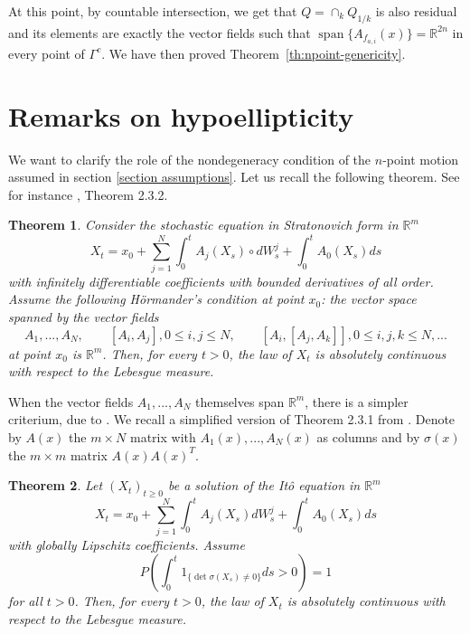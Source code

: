 \documentclass[11pt,a4paper]{article}%
\newtheorem{theorem}{Theorem}
\begin{document}
At this point, by countable intersection, we get that $Q = \cap_{k} Q_{1 / k}$
is also residual and its elements are exactly the vector fields such that
$\operatorname{span}  \{A_{f_{a, i}} (x)\} =\mathbb{R}^{2 n}$ in every point
of $\Gamma^{c}$.
We have then proved Theorem~\ref{th:npoint-genericity}.


\appendix


\section{Remarks on hypoellipticity}

\label{sec:remarks} We want to clarify the role of the nondegeneracy condition
of the $n$-point  motion assumed in section \ref{section assumptions}.
Let us recall the following theorem. See for instance \cite{Nualart}, Theorem 2.3.2.

\begin{theorem}
\label{th:hormander}
Consider the stochastic equation in Stratonovich form in $\mathbb{R}^{m}$%
\[
X_{t}=x_{0}+\sum_{j=1}^{N}\int_{0}^{t}A_{j}( X_{s}) \circ dW_{s}^{j}+\int
_{0}^{t}A_{0}( X_{s}) ds
\]
with infinitely differentiable coefficients with bounded derivatives of all
order. Assume the following H\"{o}rmander's condition at point $x_{0}$: the
vector space spanned by the vector fields
\[
A_{1},...,A_{N},\qquad[ A_{i},A_{j}] ,0\leq i,j\leq N,\qquad[ A_{i},[
A_{j},A_{k}] ] ,0\leq i,j,k\leq N,...
\]
at point $x_{0}$ is $\mathbb{R}^{m}$. Then, for every $t>0$, the law of
$X_{t}$ is absolutely continuous with respect to the Lebesgue measure.
\end{theorem}

When the vector fields $A_{1},...,A_{N}$ themselves span $\mathbb{R}^{m}$,
there is a simpler criterium, due to \cite{BouHir}. We recall a simplified
version of Theorem 2.3.1 from \cite{Nualart}. Denote by $A( x) $ the $m\times
N$ matrix with $A_{1}( x) ,...,A_{N}( x) $ as columns and by $\sigma( x) $ the
$m\times m$ matrix $A( x) A( x) ^{T}$.

\begin{theorem}
Let $(X_{t})_{t\geq0}$ be a solution of the It\^{o} equation  in
$\mathbb{R}^{m}$%
\begin{equation}
X_{t}=x_{0}+\sum_{j=1}^{N}\int_{0}^{t}A_{j}(X_{s})dW_{s}^{j}+\int_{0}^{t}%
A_{0}(X_{s})ds\label{Ito}%
\end{equation}
with
globally Lipschitz coefficients. Assume
\[
P(\int_{0}^{t}1_{\{\det\sigma(X_{s})\neq0\}}ds>0)=1
\]
for all $t>0$. Then, for every $t>0$, the law of $X_{t}$ is absolutely
continuous with respect to the Lebesgue measure.
\end{theorem}
\end{document}
